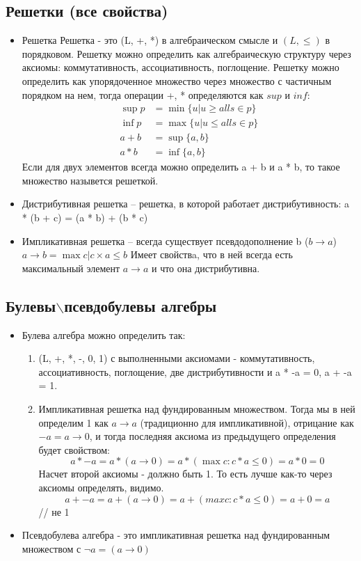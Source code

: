\documentclass[12pt]{article}
\renewcommand{\le}{\leqslant} %
\begin{document}
\subsection{Решетки (все свойства)}
\label{sec-2-8}
\begin{itemize}
\item Решетка
Решетка - это (L, +, *) в алгебраическом смысле и $(L, \le)$ в порядковом.
Решетку можно определить как алгебраическую структуру через
аксиомы: коммутативность, ассоциативность, поглощение.
Решетку можно определить как упорядоченное множество через
множество с частичным порядком на нем, тогда операции +, * определяются
как $sup$ и $inf$:
\begin{align*}
    \sup p &= \min \{u | u ≥ all s \in p\} \\
    \inf p &= \max \{u | u ≤ all s \in p\} \\
    a + b  &= \sup \{a, b\} \\
    a * b  &= \inf \{a, b\}
\end{align*}
Если для двух элементов всегда можно определить a + b и a * b, то такое
множество назывется решеткой.
\item Дистрибутивная решетка -- решетка, в которой работает дистрибутивность:
a * (b + c) = (a * b) + (b * c)
\item Импликативная решетка -- всегда существует псевдодополнение b ($b \to a$)
$a \to b = \max c | c \times a \le b$
Имеет свойствa, что в ней всегда есть максимальный элемент $a \to a$ и что
она дистрибутивна.
\end{itemize}
\subsection{Булевы$\backslash$псевдобулевы алгебры}
\label{sec-2-9}
\begin{itemize}
\item Булева алгебра можно определить так:
\begin{enumerate}
\item (L, +, *, -, 0, 1) с выполненными аксиомами - коммутативность,
ассоциативность, поглощение, две дистрибутивности и a * -a = 0,
a + -a = 1.
\item Импликативная решетка над фундированным множеством.
Тогда мы в ней определим 1 как $a \to a$ (традиционно для импликативной),
отрицание как $-a = a \to 0$, и тогда последняя аксиома из
предыдущего определения будет свойством:
\[a * -a = a * (a \to 0) = a * (\max c: c * a \le 0) = a * 0 = 0\]
Насчет второй аксиомы - должно быть 1. То есть лучше как-то
через аксиомы определять, видимо.
\[a + -a = a + (a \to 0) = a + (max c: c * a \le 0) = a + 0 = a\] // не 1
\end{enumerate}
\item Псевдобулева алгебра - это импликативная решетка над фундированным
множеством с $\lnot a = (a \to 0)$
\end{itemize}
\end{document}
